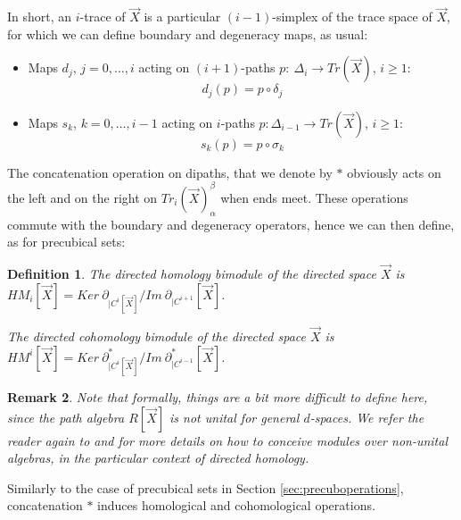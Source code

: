 \documentclass{article}
\newtheorem{definition}{Definition}[section]
\newtheorem{remark}[definition]{Remark} %
\begin{document}
In short, an $i$-trace of $\Vec{X}$ is a particular $(i-1)$-simplex of the trace space of $\Vec{X}$, for which we can define boundary and degeneracy maps, as usual: 

\begin{itemize}
\item Maps $d_{j}$, $j=0,\ldots,i$ acting on $(i+1)$-paths %
$p: \ \Delta_i \rightarrow Tr(\Vec{X})$, $i\geq 1$: %
$$d_j(p)=p\circ \delta_j$$
\item Maps $s_k$, $k=0,\ldots,i-1$ acting on $i$-paths 
$p: \Delta_{i-1} \rightarrow Tr(\Vec{X})$, $i\geq 1$: %
$$s_k(p)=p\circ \sigma_k$$
\end{itemize}

The concatenation operation on dipaths, that we denote by $*$ obviously acts on the left and on the right on $Tr_i(\Vec{X})_\alpha^\beta$ when ends meet. These operations commute with the boundary and degeneracy operators, hence 
we can then define, as for precubical sets: 

\begin{definition}
The directed homology bimodule of the directed space $\Vec{X}$ is $HM_i[\Vec{X}]=Ker \ \partial_{|C^i[\Vec{X}]}/Im \ \partial_{|C^{i+1}}[\Vec{X}]$.

The directed cohomology bimodule of the directed space $\Vec{X}$ is $HM^i[\Vec{X}]=Ker \ \partial^*_{|C^i[\Vec{X}]}/Im \ \partial^*_{|C^{i-1}}[\Vec{X}]$.
\end{definition}

\begin{remark}
Note that formally, things are a bit more difficult to define here, since the path algebra $R[\Vec{X}]$ is not unital for general $d$-spaces. We refer the reader again to \cite{eliot} and \cite{albert} for more details on how to conceive modules over non-unital algebras, in the particular context of directed homology. 
\end{remark}



Similarly to the case of precubical sets in Section \ref{sec:precuboperations},  concatenation $*$ induces homological and cohomological operations. 
\end{document}
